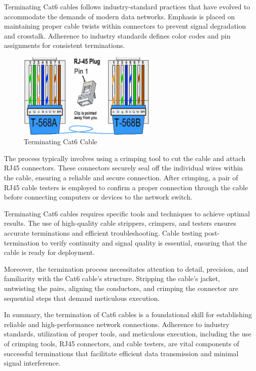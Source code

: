 Terminating Cat6 cables follows industry-standard practices that have evolved to accommodate the demands of modern data networks. Emphasis is placed on maintaining proper cable twists within connectors to prevent signal degradation and crosstalk. Adherence to industry standards defines color codes and pin assignments for consistent terminations.

\begin{figure}[ht]
    \centering
    \includegraphics[width=0.6\textwidth]{images/cat6-termination.png}
    \caption{Terminating Cat6 Cable}
    \label{fig:cat6-termination}
\end{figure}

The process typically involves using a crimping tool to cut the cable and attach RJ45 connectors. These connectors securely seal off the individual wires within the cable, ensuring a reliable and secure connection. After crimping, a pair of RJ45 cable testers is employed to confirm a proper connection through the cable before connecting computers or devices to the network switch.

Terminating Cat6 cables requires specific tools and techniques to achieve optimal results. The use of high-quality cable strippers, crimpers, and testers ensures accurate terminations and efficient troubleshooting. Cable testing post-termination to verify continuity and signal quality is essential, ensuring that the cable is ready for deployment.

Moreover, the termination process necessitates attention to detail, precision, and familiarity with the Cat6 cable's structure. Stripping the cable's jacket, untwisting the pairs, aligning the conductors, and crimping the connector are sequential steps that demand meticulous execution.

In summary, the termination of Cat6 cables is a foundational skill for establishing reliable and high-performance network connections. Adherence to industry standards, utilization of proper tools, and meticulous execution, including the use of crimping tools, RJ45 connectors, and cable testers, are vital components of successful terminations that facilitate efficient data transmission and minimal signal interference.
